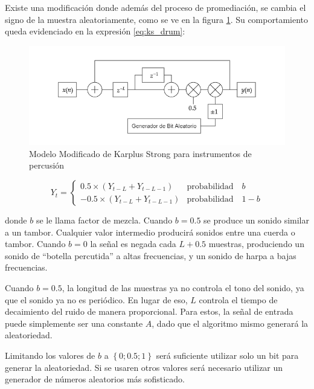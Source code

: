 Existe una modificación donde además del proceso de promediación, se cambia el signo de la muestra aleatoriamente, como se ve en la figura \ref{fig:ks_drum}. Su comportamiento queda evidenciado en la expresión \eqref{eq:ks_drum}:

\begin{figure}[ht]
    \centering
    \includegraphics[width = \linewidth]{res/fig_ks_drum.png}
    \caption{Modelo Modificado de Karplus Strong para instrumentos de percusión}
    \label{fig:ks_drum}
\end{figure}

\begin{equation}
    Y_t = 
    \begin{cases}
        0.5\times \left(Y_{t-L}+Y_{t-L-1}\right) &   \text{probabilidad} \quad b \\
        -0.5\times \left(Y_{t-L}+Y_{t-L-1}\right) &   \text{probabilidad} \quad 1-b
    \end{cases}
    \label{eq:ks_drum}
\end{equation}

donde $b$ se le llama factor de mezcla. Cuando $b = 0.5$ se produce un sonido similar a un tambor. Cualquier valor intermedio producirá sonidos entre una cuerda o tambor. Cuando $b = 0$ la señal es negada cada $L + 0.5$ muestras, produciendo un sonido de ``botella percutida'' a altas frecuencias, y un sonido de harpa a bajas frecuencias.

Cuando $b=0.5$, la longitud de las muestras ya no controla el tono del sonido, ya que el sonido ya no es periódico. En lugar de eso, $L$ controla el tiempo de decaimiento del ruido de manera proporcional. Para estos, la señal de entrada puede simplemente ser una constante $A$, dado que el algoritmo mismo generará la aleatoriedad.

Limitando los valores de $b$ a $\left\{ 0;0.5;1\right\}$ será suficiente utilizar solo un bit para generar la aleatoriedad. Si se usaren otros valores será necesario utilizar un generador de números aleatorios más sofisticado.

